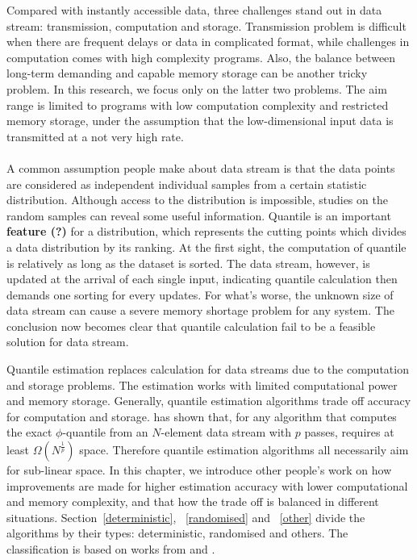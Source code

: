 Compared with instantly accessible data, three challenges stand out in data stream: transmission, computation and storage\cite{muthukrishnanDataStreamsAlgorithms2005}.
Transmission problem is difficult when there are frequent delays or data in complicated format,
while challenges in computation comes with high complexity programs. Also, the balance between long-term demanding and capable memory storage can be another tricky problem.
In this research, we focus only on the latter two problems. The aim range is limited to programs with low computation complexity and restricted memory storage, under the assumption that the low-dimensional input data is transmitted at a not very high rate.
\\\\
A common assumption people make about data stream is that the data points are considered as independent individual samples from a certain statistic distribution. 
Although access to the distribution is impossible, studies on the random samples can reveal some useful information. 
Quantile is an important \textbf{feature (?)} for a distribution, which represents the cutting points which divides a data distribution by its ranking.
At the first sight, the computation of quantile is relatively as long as the dataset is sorted.
The data stream, however, is updated at the arrival of each single input, indicating quantile calculation then demands one sorting for every updates.
For what's worse, the unknown size of data stream can cause a severe memory shortage problem for any system. 
The conclusion now becomes clear that quantile calculation fail to be a feasible solution for data stream.

Quantile estimation replaces calculation for data streams due to the computation and storage problems.
The estimation works with limited computational power and memory storage.
Generally, quantile estimation algorithms trade off accuracy for computation and storage.
\citeauthor{munroSelectionSortingLimited1980} \cite{munroSelectionSortingLimited1980} has shown that, for any algorithm that computes the exact $\phi$-quantile from an $N$-element data stream with $p$ passes, requires at least $\Omega(N^{\frac{1}{p}})$ space.
Therefore quantile estimation algorithms all necessarily aim for sub-linear space.
In this chapter, we introduce other people's work on how improvements are made for higher estimation accuracy with lower computational and memory complexity, and that how the trade off is balanced in different situations. Section~\ref{deterministic}, ~\ref{randomised} and ~\ref{other} divide the algorithms by their types: deterministic, randomised and others. The classification is based on works from \citeauthor{buragohainQuantilesStreams2009}\cite{buragohainQuantilesStreams2009} and \citeauthor{wangQuantilesDataStreams2013}\cite{wangQuantilesDataStreams2013}.

